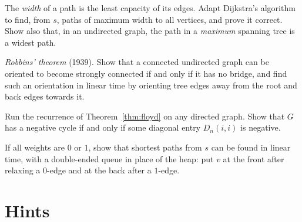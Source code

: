 \begin{exercise}[$\star\star$]\label{ex:widest}
The \emph{width} of a path is the least capacity of its edges. Adapt Dijkstra's algorithm to find, from $s$, paths of maximum width to all vertices, and prove it correct. Show also that, in an undirected graph, the path in a
\emph{maximum} spanning tree is a widest path.
\end{exercise}

\begin{exercise}[$\star\star$]\label{ex:robbins}
\emph{Robbins' theorem} (1939). Show that a connected undirected graph can be oriented to become strongly connected if and only if it has no bridge, and find such an orientation in linear time by orienting tree edges
away from the root and back edges towards it.
\end{exercise}

\begin{exercise}[$\star$]\label{ex:fwneg}
Run the recurrence of Theorem~\ref{thm:floyd} on any directed graph. Show that $G$ has a negative cycle if and only if some diagonal entry $D_n(i,i)$ is negative.
\end{exercise}

\begin{exercise}[$\star\star$]\label{ex:zeroone}
If all weights are $0$ or $1$, show that shortest paths from $s$ can be found in linear time, with a double-ended queue in place of the heap: put $v$ at the front after relaxing a $0$-edge and at the back after a $1$-edge.
\end{exercise}

\section{Hints}

